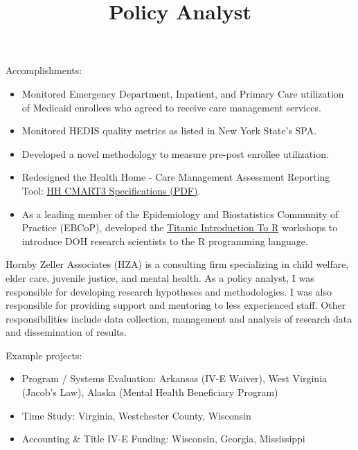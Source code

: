 \documentclass[line, margin, 10pt]{res}
\begin{document}
\begin{resume}
\begin{position}
    Accomplishments:
    \begin{itemize}
    \item Monitored Emergency Department, Inpatient, and Primary Care
      utilization of Medicaid enrollees who agreed to receive care
      management services.
    \item Monitored HEDIS quality metrics as listed in New York
      State's SPA.
    \item Developed a novel methodology to measure pre-post enrollee utilization.
    \item Redesigned the Health Home - Care Management Assessment
      Reporting Tool:
      \href{https://www.health.ny.gov/health_care/medicaid/program/medicaid_health_homes/assessment_quality_measures/docs/hh_cmart_specs_v3.pdf}{HH
        CMART3 Specifications (PDF)}.
    \item As a leading member of the Epidemiology and Biostatistics
      Community of Practice (EBCoP), developed the
      \href{http://choens.github.io/titanic/}{Titanic Introduction To
        R} workshops to introduce DOH research scientists to the R
      programming language.
    \end{itemize}
  \end{position}

  \title{Policy Analyst}
  \begin{position}
    Hornby Zeller Associates (HZA) is a consulting firm specializing
    in child welfare, elder care, juvenile justice, and mental
    health. As a policy analyst, I was responsible for developing
    research hypotheses and methodologies. I was also responsible for
    providing support and mentoring to less experienced staff. Other
    responsibilities include data collection, management and analysis
    of research data and dissemination of results.

    Example projects:
    \begin{itemize}
    \item Program / Systems Evaluation: Arkansas (IV-E Waiver), West
      Virginia (Jacob's Law), Alaska (Mental Health Beneficiary Program)
    \item Time Study: Virginia, Westchester County, Wisconsin
    \item Accounting \& Title IV-E Funding: Wisconsin, Georgia, Mississippi
    \end{itemize}


\end{position}
\end{resume}
\end{document}
